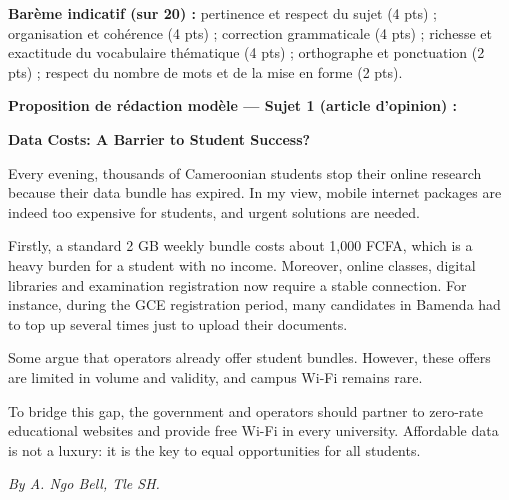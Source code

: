 \documentclass[11pt]{article}
\begin{document}
\begin{corrige}
\textbf{Barème indicatif (sur 20) :} pertinence et respect du sujet (4 pts) ; organisation et cohérence (4 pts) ; correction grammaticale (4 pts) ; richesse et exactitude du vocabulaire thématique (4 pts) ; orthographe et ponctuation (2 pts) ; respect du nombre de mots et de la mise en forme (2 pts).

\textbf{Proposition de rédaction modèle — Sujet 1 (article d'opinion) :}
\begin{textebox}
\textbf{Data Costs: A Barrier to Student Success?}

Every evening, thousands of Cameroonian students stop their online research because their data bundle has expired. In my view, mobile internet packages are indeed too expensive for students, and urgent solutions are needed.

Firstly, a standard 2 GB weekly bundle costs about 1,000 FCFA, which is a heavy burden for a student with no income. Moreover, online classes, digital libraries and examination registration now require a stable connection. For instance, during the GCE registration period, many candidates in Bamenda had to top up several times just to upload their documents.

Some argue that operators already offer student bundles. However, these offers are limited in volume and validity, and campus Wi-Fi remains rare.

To bridge this gap, the government and operators should partner to zero-rate educational websites and provide free Wi-Fi in every university. Affordable data is not a luxury: it is the key to equal opportunities for all students.

\emph{By A. Ngo Bell, Tle SH.}
\end{textebox}


\end{corrige}
\end{document}
